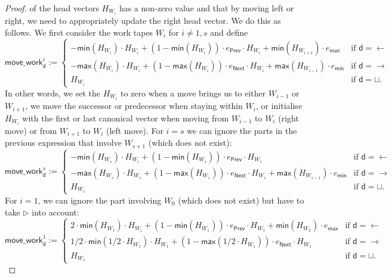 \begin{proof}
of the head vectors $H_{W_i}$ has a non-zero value and that by moving left or right, we need to 
appropriately update the right head vector. We do this as follows. We first consider the work tapes 
$W_i$ for $i\neq 1,s$ and define
$$
\mathsf{move\_work}^i_{\mathsf{d}}:=
\begin{cases}
	-\mathsf{min}(H_{W_i})\cdot H_{W_i} + (1-\mathsf{min}(H_{W_i}))\cdot e_{\mathsf{Prev}}\cdot H_{W_i} + \mathsf{min}(H_{W_{i+1}})\cdot e_{\mathsf{max}} & \text{if $\mathsf{d}=\leftarrow$}\\
		-\mathsf{max}(H_{W_i})\cdot H_{W_i} + (1-\mathsf{max}(H_{W_i}))\cdot e_{\mathsf{Next}}\cdot H_{W_i} + \mathsf{max}(H_{W_{i-1}})\cdot e_{\mathsf{min}} & \text{if $\mathsf{d}=\rightarrow$}\\
	H_{W_i} & \text{if $\mathsf{d}=\sqcup$}. 	
\end{cases}
$$
In other words, we set the $H_{W_i}$ to zero when a move brings us to either $W_{i-1}$ or $W_{i+1}$, we
move the successor or predecessor when staying within $W_i$, or initialise $H_{W_i}$ with the first or 
last canonical vector when moving from $W_{i-1}$ to $W_i$ (right move) or from $W_{i+1}$ to $W_i$ (left move).
For $i=s$ we can ignore the parts in the previous expression that involve $W_{s+1}$ (which does not exist):
$$
\mathsf{move\_work}^s_{\mathsf{d}}:=
\begin{cases}
	-\mathsf{min}(H_{W_s})\cdot H_{W_i} + (1-\mathsf{min}(H_{W_s}))\cdot e_{\mathsf{Prev}}\cdot H_{W_s}  & \text{if $\mathsf{d}=\leftarrow$}\\
		-\mathsf{max}(H_{W_s}) \cdot H_{W_s} + (1-\mathsf{max}(H_{W_s}))\cdot e_{\mathsf{Next}}\cdot H_{W_s} + \mathsf{max}(H_{W_{s-1}})\cdot e_{\mathsf{min}} & \text{if $\mathsf{d}=\rightarrow$}\\
	H_{W_s} & \text{if $\mathsf{d}=\sqcup$}. 	
\end{cases}
$$
For $i=1$, we can ignore the part involving $W_{0}$ (which does not exist) but have to take $\rhd$ 
into account:
$$
\mathsf{move\_work}^1_{\mathsf{d}}:=
\begin{cases}
	2\cdot \mathsf{min}(H_{W_1})\cdot H_{W_i} + (1-\mathsf{min}(H_{W_1}))\cdot e_{\mathsf{Prev}}\cdot H_{W_1} + \mathsf{min}(H_{W_{2}})\cdot e_{\mathsf{max}} & \text{if $\mathsf{d}=\leftarrow$}\\
		1/2\cdot\mathsf{min}(1/2\cdot H_{W_1})\cdot H_{W_1} + (1-\mathsf{max}(1/2\cdot H_{W_1}))\cdot e_{\mathsf{Next}}\cdot H_{W_1}  & \text{if $\mathsf{d}=\rightarrow$}\\
	H_{W_1} & \text{if $\mathsf{d}=\sqcup$}. 	

\end{cases}$$
\end{proof}
